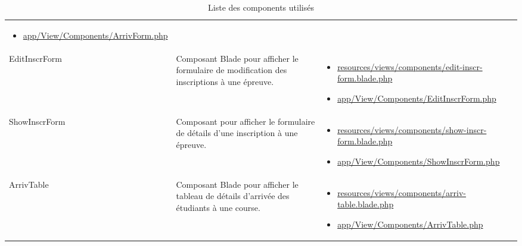 \begin{table}[H]
\begin{adjustbox}{width=\textwidth}
\begin{tabular}{|l|p{}|p{}|}
\begin{itemize}
				\item \url{app/View/Components/ArrivForm.php} \end{itemize} \\
			EditInscrForm 	& Composant Blade pour afficher le formulaire de modification des inscriptions à une épreuve. 				& \begin{itemize}\item \url{resources/views/components/edit-inscr-form.blade.php}
				\item \url{app/View/Components/EditInscrForm.php} \end{itemize} \\
			ShowInscrForm 	& Composant pour afficher le formulaire de détails d'une inscription à une épreuve. 							& \begin{itemize}\item \url{resources/views/components/show-inscr-form.blade.php}
				\item \url{app/View/Components/ShowInscrForm.php} \end{itemize} \\
			ArrivTable 		& Composant Blade pour afficher le tableau de détails d'arrivée des étudiants à une course.  & \begin{itemize}\item \url{resources/views/components/arriv-table.blade.php}
				\item \url{app/View/Components/ArrivTable.php} \end{itemize} \\	
			\hline
		\end{tabular}
	\end{adjustbox}
	\caption{Liste des components utilisés}
\end{table}